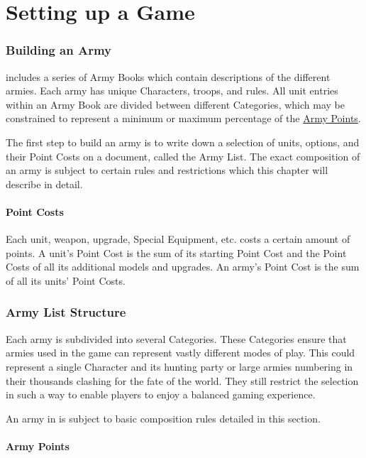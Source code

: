 
\part{Setting up a Game}
\label{setting_up_a_game}

\section{Building an Army}
\label{building_an_army}

\nameofthegame{} includes a series of Army Books which contain descriptions of the different armies. Each army has unique Characters, troops, and rules. All unit entries within an Army Book are divided between different Categories, which may be constrained to represent a minimum or maximum percentage of the \hyperref[army_points]{Army Points}.

The first step to build an army is to write down a selection of units, options, and their Point Costs on a document, called the Army List. The exact composition of an army is subject to certain rules and restrictions which this chapter will describe in detail.

\subsection{Point Costs}
\label{point_costs}

Each unit, weapon, upgrade, Special Equipment, etc. costs a certain amount of points. A unit's Point Cost is the sum of its starting Point Cost and the Point Costs of all its additional models and upgrades. An army's Point Cost is the sum of all its units' Point Costs.

\section{Army List Structure}
\label{army_list_structure}

Each army is subdivided into several Categories. These Categories ensure that armies used in the game can represent vastly different modes of play. This could represent a single Character and its hunting party or large armies numbering in their thousands clashing for the fate of the world. They still restrict the selection in such a way to enable players to enjoy a balanced gaming experience.

An army in \nameofthegame{} is subject to basic composition rules detailed in this section.

\subsection{Army Points}
\label{army_points}

